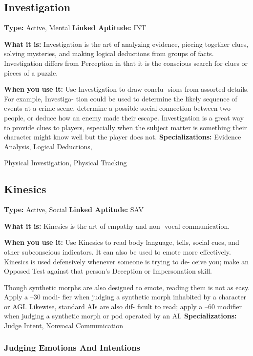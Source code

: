 \subsection{Investigation}

\textbf{Type:} Active, Mental
\textbf{Linked Aptitude:} INT

\textbf{What it is:} Investigation is the art of analyzing 
evidence, piecing together clues, solving mysteries, 
and making logical deductions from groups of facts. 
Investigation differs from Perception in that it is the 
conscious search for clues or pieces of a puzzle.

\textbf{When you use it:} Use Investigation to draw conclu-
sions from assorted details. For example, Investiga-
tion could be used to determine the likely sequence 
of events at a crime scene, determine a possible social 
connection between two people, or deduce how an 
enemy made their escape. Investigation is a great way 
to provide clues to players, especially when the subject 
matter is something their character might know well 
but the player does not.
\textbf{Specializations:} Evidence Analysis, Logical Deductions, 

Physical Investigation, Physical Tracking

\subsection{Kinesics}

\textbf{Type:} Active, Social
\textbf{Linked Aptitude:} SAV

\textbf{What it is:} Kinesics is the art of empathy and non-
vocal communication.

\textbf{When you use it:} Use Kinesics to read body language, 
tells, social cues, and other subconscious indicators. It 
can also be used to emote more effectively. Kinesics 
is used defensively whenever someone is trying to de-
ceive you; make an Opposed Test against that person's 
Deception or Impersonation skill.

Though synthetic morphs are also designed to 
emote, reading them is not as easy. Apply a –30 modi-
fier when judging a synthetic morph inhabited by a 
character or AGI. Likewise, standard AIs are also dif-
ficult to read; apply a –60 modifier when judging a 
synthetic morph or pod operated by an AI.
\textbf{Specializations:} Judge Intent, Nonvocal Communication

\subsubsection{Judging Emotions And Intentions}


